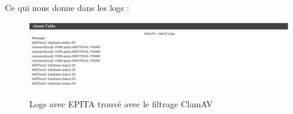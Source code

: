 Ce qui nous donne dans les logs :
\begin{figure}[h!]
    \begin{center}
        \includegraphics[scale=0.4]{Interception_Screenshots/clamAV03.png}
        \label{Pfsense_Screeshots/interception/18}
        \caption{Logs avec EPITA trouvé avec le filtrage ClamAV}
    \end{center}
\end{figure}
\FloatBarrier 